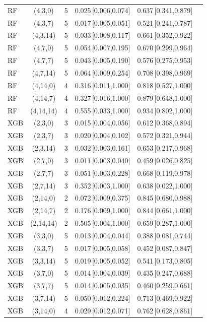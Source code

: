 \begin{longtable}{lccccc}
RF & (4,3,0) & 5 & 0.025\,[0.006,0.074] & 0.637\,[0.341,0.879] \\
RF & (4,3,7) & 5 & 0.017\,[0.005,0.051] & 0.521\,[0.241,0.787] \\
RF & (4,3,14) & 5 & 0.033\,[0.008,0.117] & 0.661\,[0.352,0.922] \\
RF & (4,7,0) & 5 & 0.054\,[0.007,0.195] & 0.670\,[0.299,0.964] \\
RF & (4,7,7) & 5 & 0.043\,[0.005,0.190] & 0.576\,[0.275,0.953] \\
RF & (4,7,14) & 5 & 0.064\,[0.009,0.254] & 0.708\,[0.398,0.969] \\
RF & (4,14,0) & 4 & 0.316\,[0.011,1.000] & 0.818\,[0.527,1.000] \\
RF & (4,14,7) & 4 & 0.327\,[0.016,1.000] & 0.879\,[0.648,1.000] \\
RF & (4,14,14) & 4 & 0.555\,[0.033,1.000] & 0.934\,[0.802,1.000] \\
XGB & (2,3,0) & 3 & 0.015\,[0.004,0.056] & 0.612\,[0.368,0.894] \\
XGB & (2,3,7) & 3 & 0.020\,[0.004,0.102] & 0.572\,[0.321,0.944] \\
XGB & (2,3,14) & 3 & 0.032\,[0.003,0.161] & 0.653\,[0.217,0.968] \\
XGB & (2,7,0) & 3 & 0.011\,[0.003,0.040] & 0.459\,[0.026,0.825] \\
XGB & (2,7,7) & 3 & 0.051\,[0.003,0.228] & 0.668\,[0.119,0.978] \\
XGB & (2,7,14) & 3 & 0.352\,[0.003,1.000] & 0.638\,[0.022,1.000] \\
XGB & (2,14,0) & 2 & 0.072\,[0.009,0.375] & 0.845\,[0.680,0.988] \\
XGB & (2,14,7) & 2 & 0.176\,[0.009,1.000] & 0.844\,[0.661,1.000] \\
XGB & (2,14,14) & 2 & 0.505\,[0.004,1.000] & 0.659\,[0.287,1.000] \\
XGB & (3,3,0) & 5 & 0.013\,[0.004,0.044] & 0.388\,[0.081,0.744] \\
XGB & (3,3,7) & 5 & 0.017\,[0.005,0.058] & 0.452\,[0.087,0.847] \\
XGB & (3,3,14) & 5 & 0.019\,[0.005,0.052] & 0.541\,[0.173,0.805] \\
XGB & (3,7,0) & 5 & 0.014\,[0.004,0.039] & 0.435\,[0.247,0.688] \\
XGB & (3,7,7) & 5 & 0.014\,[0.005,0.035] & 0.460\,[0.259,0.661] \\
XGB & (3,7,14) & 5 & 0.050\,[0.012,0.224] & 0.713\,[0.469,0.922] \\
XGB & (3,14,0) & 4 & 0.029\,[0.012,0.071] & 0.762\,[0.628,0.861] \\

\end{longtable}
